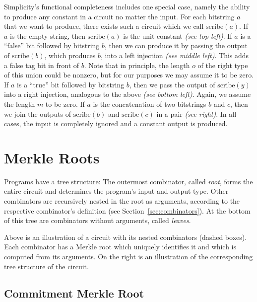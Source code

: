 
%
Simplicity's functional completeness includes one special case,
namely the ability to produce any constant in a circuit no matter the input.
For each bitstring $a$ that we want to produce,
there exists such a circuit which we call $\text{scribe}(a)$.
%
If $a$ is the empty string,
then $\text{scribe}(a)$ is the unit constant \emph{(see top left)}.
%
If $a$ is a \enquote{false} bit followed by bitstring $b$,
then we can produce it by passing the output of $\text{scribe}(b)$,
which produces $b$,
into a left injection \emph{(see middle left)}.
This adds a false tag bit in front of $b$.
Note that in principle,
the length $o$ of the right type of this union could be nonzero,
but for our purposes we may assume it to be zero.
%
If $a$ is a \enquote{true} bit followed by bitstring $b$,
then we pass the output of $\text{scribe}(y)$ into a right injection,
analogous to the above \emph{(see bottom left)}.
Again,
we assume the length $m$ to be zero.
%
If $a$ is the concatenation of two bitstrings $b$ and $c$,
then we join the outputs of $\text{scribe}(b)$ and $\text{scribe}(c)$ in a pair \emph{(see right)}.
%
In all cases,
the input is completely ignored and a constant output is produced.

\section{Merkle Roots}%
\label{sec:merkle}

Programs have a tree structure:
The outermost combinator, called \emph{root},
forms the entire circuit and determines the program's input and output type.
Other combinators are recursively nested in the root as arguments,
according to the respective combinator's definition (see Section~\ref{sec:combinators}).
At the bottom of this tree are combinators without arguments,
called \emph{leaves}.


%
Above is an illustration of a circuit with its nested combinators (dashed boxes).
Each combinator has a Merkle root which uniquely identifies it and which is computed from its arguments.
On the right is an illustration of the corresponding tree structure of the circuit.

\subsection{Commitment Merkle Root}

